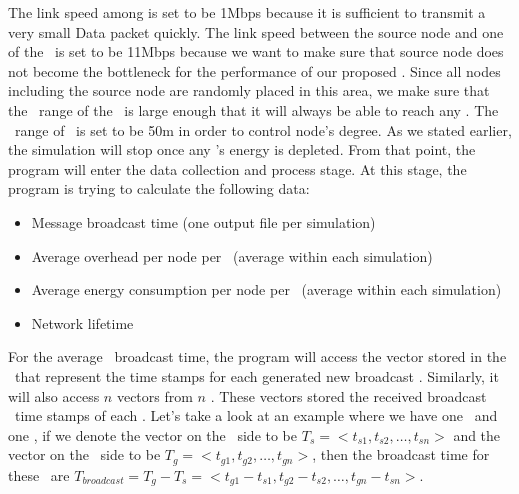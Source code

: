 The link speed among \gns is set to be 1Mbps because it is sufficient to transmit a very small Data packet quickly. The link speed between the source node and one of the \gn ~is set to be 11Mbps because we want to make sure that source node does not become the bottleneck for the performance of our proposed \gp. Since all nodes including the source node are randomly placed in this area, we make sure that the \wf ~range of the \sn ~is large enough that it will always be able to reach any \gns. The \wf ~range of \gns ~is set to be 50m in order to control node's degree. As we stated earlier, the simulation will stop once any \gn's energy is depleted. From that point, the program will enter the data collection and process stage. At this stage, the program is trying to calculate the following data:

\begin{itemize}
	\item Message broadcast time (one output file per simulation)
	\item Average overhead per node per \msg ~(average within each simulation)
	\item Average energy consumption per node per \msg ~(average within each simulation)
	\item Network lifetime
\end{itemize}

For the average \msg ~broadcast time, the program will access the vector stored in the \sn ~that represent the time stamps for each generated new broadcast \msg. Similarly, it will also access $n$ vectors from $n$ \gns. These vectors stored the received broadcast \msg ~time stamps of each \gn. Let's take a look at an example where we have one \sn ~and one \gn, if we denote the vector on the \sn ~side to be $T_s=<t_{s1}, t_{s2}, \ldots, t_{sn}>$ and the vector on the \gn ~side to be $T_g=<t_{g1}, t_{g2}, \ldots, t_{gn}>$, then the broadcast time for these \msgs ~are $T_{broadcast}= T_g - T_s = <t_{g1}-t_{s1}, t_{g2}-t_{s2}, \ldots, t_{gn}-t_{sn}>$. 
